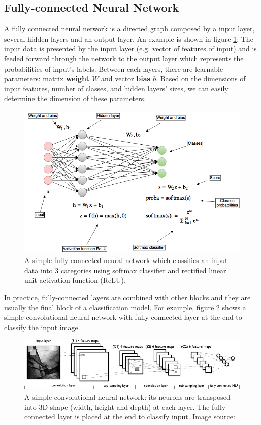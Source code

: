 \subsection{Fully-connected Neural Network}
A fully connected neural network is a directed graph composed by a input layer, several hidden layers and an output layer. An example is shown in figure \ref{fig:fcNet}: The input data is presented by the input layer (e.g. vector of features of input) and is feeded forward through the network to the output layer which represents the probabilities of input's labels. Between each layers, there are learnable parameters: matrix \textbf{weight $W$} and vector \textbf{bias $b$}. Based on the dimensions of input features, number of classes, and hidden layers' sizes, we can easily determine the dimension of these parameters. 
\begin{figure}[tb]
	\centering
	\includegraphics[width=0.9\hsize]{./figures/fcNet}
	\caption{A simple fully connected neural network which classifies an input data into 3 categories using softmax classifier and rectified linear unit activation function (ReLU).}
	\label{fig:fcNet}
\end{figure}
In practice, fully-connected layers are combined with other blocks and they are usually the final block of a classification model. For example, figure \ref{fig:convNet1} shows a simple convolutional neural network with fully-connected layer at the end to classify the input image.
\begin{figure}[tb]
	\centering
	\includegraphics[width=0.9\hsize]{./figures/convNet1}
	\caption{A simple convolutional neural network: its neurons are transposed into 3D shape (width, height and depth) at each layer. The fully connected layer is placed at the end to classify input. Image source: \cite{deeplearningTut}}
	\label{fig:convNet1}
\end{figure}
